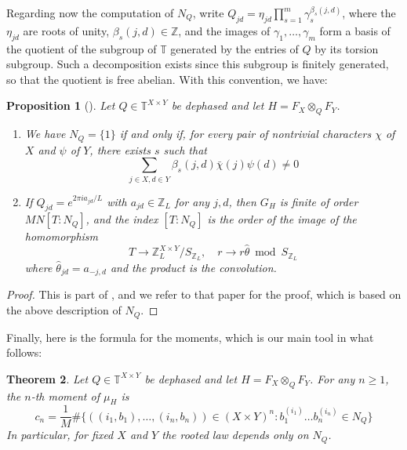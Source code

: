 \documentclass[11pt,reqno]{amsart}
\newtheorem{thm}{Theorem}[section]
\newtheorem{prop}[thm]{Proposition}
\theoremstyle{definition}
\numberwithin{equation}{section}
\begin{document}
Regarding now the computation of $N_Q$, write $Q_{jd}=\eta_{jd}\prod_{s=1}^m\gamma_s^{\beta_s(j,d)}$, where the $\eta_{jd}$ are roots of unity, $\beta_s(j,d)\in\mathbb Z$, and the images of $\gamma_1,\ldots,\gamma_m$ form a basis of the quotient of the subgroup of $\mathbb T$ generated by the entries of $Q$ by its torsion subgroup. Such a decomposition exists since this subgroup is finitely generated, so that the quotient is free abelian. With this convention, we have:

\begin{prop}[\cite{BO26}]\label{prop:dita-criterion}
Let $Q\in\mathbb T^{X\times Y}$ be dephased and let $H=F_X\otimes_QF_Y$.
\begin{enumerate}
\item We have $N_Q=\{1\}$ if and only if, for every pair of nontrivial characters $\chi$ of $X$ and $\psi$ of $Y$, there exists $s$ such that
$$\sum_{j\in X,d\in Y}\beta_s(j,d)\bar\chi(j)\psi(d)
\neq0$$
\item If $Q_{jd}=e^{2\pi ia_{jd}/L}$ with $a_{jd}\in\mathbb Z_L$ for any $j,d$, then $G_H$ is finite of order $MN[T:N_Q]$, and the index $[T:N_Q]$ is the order of the image of the homomorphism
$$T\to\mathbb Z_L^{X\times Y}/S_{\mathbb Z_L},
\quad r\to r\widehat\theta\bmod S_{\mathbb Z_L}$$
where $\widehat\theta_{jd}=a_{-j,d}$ and the product is the convolution.
\end{enumerate}
\end{prop}

\begin{proof}
This is part of \cite[Theorem 4.4]{BO26}, and we refer to that paper for the proof, which is based on the above description of $N_Q$.
\end{proof}

Finally, here is the formula for the moments, which is our main tool in what follows:

\begin{thm}\label{thm:dita-words}
Let $Q\in\mathbb T^{X\times Y}$ be dephased and let $H=F_X\otimes_QF_Y$. For any $n\geq1$, the $n$-th moment of $\mu_H$ is
\begin{equation}\label{eq:dita-words}
c_n=\frac1M\#\Big\{((i_1,b_1),\ldots,(i_n,b_n))\in(X\times Y)^n:
b_1^{(i_1)}\ldots b_n^{(i_n)}\in N_Q\Big\}
\end{equation}
In particular, for fixed $X$ and $Y$ the rooted law depends only on $N_Q$.
\end{thm}
\end{document}
